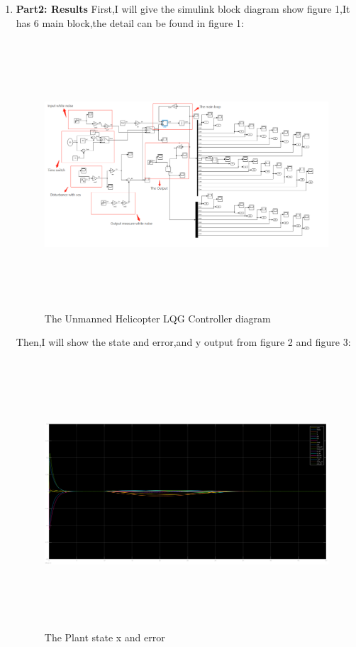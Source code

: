 \documentclass[12pt, a4paper]{article}
\begin{document}
\begin{enumerate}[1.]
\item \textbf{ Part2: Results}
First,I will give the simulink block diagram show figure 1,It has 6 main block,the detail can be found in figure 1:\\
\begin{figure}[H]
    \centering
    \includegraphics[width=20cm,height=10cm,scale=0.6]{block_diagram.png}
    \caption{The Unmanned Helicopter LQG Controller diagram}
    \label{fig:label}
    \end{figure}

Then,I will show the state and error,and y output from figure 2 and figure 3:\\
\begin{figure}[H]
    \centering
    \includegraphics[width=20cm,height=10cm,scale=0.6]{state_18.png}
    \caption{The Plant state x and error}
    \label{fig:label}
    \end{figure}


\end{enumerate}
\end{document}
